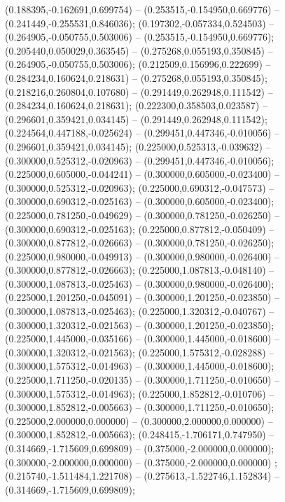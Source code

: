  (0.188395,-0.162691,0.699754) -- (0.253515,-0.154950,0.669776) -- (0.241449,-0.255531,0.846036);
 (0.197302,-0.057334,0.524503) -- (0.264905,-0.050755,0.503006) -- (0.253515,-0.154950,0.669776);
 (0.205440,0.050029,0.363545) -- (0.275268,0.055193,0.350845) -- (0.264905,-0.050755,0.503006);
 (0.212509,0.156996,0.222699) -- (0.284234,0.160624,0.218631) -- (0.275268,0.055193,0.350845);
 (0.218216,0.260804,0.107680) -- (0.291449,0.262948,0.111542) -- (0.284234,0.160624,0.218631);
 (0.222300,0.358503,0.023587) -- (0.296601,0.359421,0.034145) -- (0.291449,0.262948,0.111542);
 (0.224564,0.447188,-0.025624) -- (0.299451,0.447346,-0.010056) -- (0.296601,0.359421,0.034145);
 (0.225000,0.525313,-0.039632) -- (0.300000,0.525312,-0.020963) -- (0.299451,0.447346,-0.010056);
 (0.225000,0.605000,-0.044241) -- (0.300000,0.605000,-0.023400) -- (0.300000,0.525312,-0.020963);
 (0.225000,0.690312,-0.047573) -- (0.300000,0.690312,-0.025163) -- (0.300000,0.605000,-0.023400);
 (0.225000,0.781250,-0.049629) -- (0.300000,0.781250,-0.026250) -- (0.300000,0.690312,-0.025163);
 (0.225000,0.877812,-0.050409) -- (0.300000,0.877812,-0.026663) -- (0.300000,0.781250,-0.026250);
 (0.225000,0.980000,-0.049913) -- (0.300000,0.980000,-0.026400) -- (0.300000,0.877812,-0.026663);
 (0.225000,1.087813,-0.048140) -- (0.300000,1.087813,-0.025463) -- (0.300000,0.980000,-0.026400);
 (0.225000,1.201250,-0.045091) -- (0.300000,1.201250,-0.023850) -- (0.300000,1.087813,-0.025463);
 (0.225000,1.320312,-0.040767) -- (0.300000,1.320312,-0.021563) -- (0.300000,1.201250,-0.023850);
 (0.225000,1.445000,-0.035166) -- (0.300000,1.445000,-0.018600) -- (0.300000,1.320312,-0.021563);
 (0.225000,1.575312,-0.028288) -- (0.300000,1.575312,-0.014963) -- (0.300000,1.445000,-0.018600);
 (0.225000,1.711250,-0.020135) -- (0.300000,1.711250,-0.010650) -- (0.300000,1.575312,-0.014963);
 (0.225000,1.852812,-0.010706) -- (0.300000,1.852812,-0.005663) -- (0.300000,1.711250,-0.010650);
 (0.225000,2.000000,0.000000) -- (0.300000,2.000000,0.000000) -- (0.300000,1.852812,-0.005663);
 (0.248415,-1.706171,0.747950) -- (0.314669,-1.715609,0.699809) -- (0.375000,-2.000000,0.000000);
 (0.300000,-2.000000,0.000000) -- (0.375000,-2.000000,0.000000) ;
 (0.215740,-1.511484,1.221708) -- (0.275613,-1.522746,1.152834) -- (0.314669,-1.715609,0.699809);

